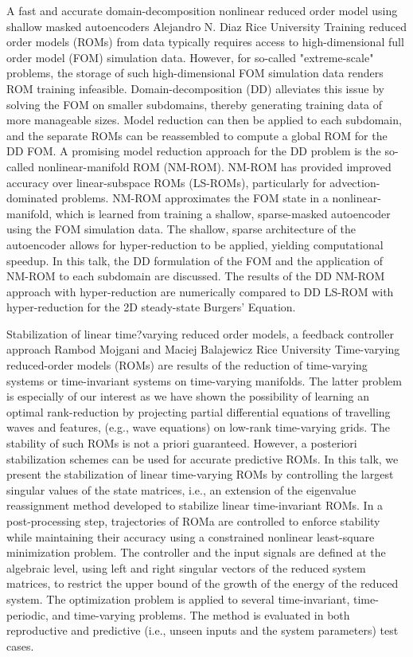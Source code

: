 \vspace{1.5ex}
\abs
{A fast and accurate domain-decomposition nonlinear reduced order model using shallow masked autoencoders}
{Alejandro N. Diaz}
{Rice University}
{Training reduced order models (ROMs) from data typically requires access to high-dimensional full order model (FOM) simulation data. However, for so-called "extreme-scale" problems, the storage of such high-dimensional FOM simulation data renders ROM training infeasible. Domain-decomposition (DD) alleviates this issue by solving the FOM on smaller subdomains, thereby generating training data of more manageable sizes. Model reduction can then be applied to each subdomain, and the separate ROMs can be reassembled to compute a global ROM for the DD FOM. A promising model reduction approach for the DD problem is the so-called nonlinear-manifold ROM (NM-ROM). NM-ROM has provided improved accuracy over linear-subspace ROMs (LS-ROMs), particularly for advection-dominated problems. NM-ROM approximates the FOM state in a nonlinear-manifold, which is learned from training a shallow, sparse-masked autoencoder using the FOM simulation data. The shallow, sparse architecture of the autoencoder allows for hyper-reduction to be applied, yielding computational speedup. In this talk, the DD formulation of the FOM and the application of NM-ROM to each subdomain are discussed. The results of the DD NM-ROM approach with hyper-reduction are numerically compared to DD LS-ROM with hyper-reduction for the 2D steady-state Burgers' Equation.}


\vspace{1.5ex}
\abs
{Stabilization of linear time?varying reduced order models, a feedback controller approach}
{Rambod Mojgani and Maciej Balajewicz}
{Rice University}
{Time-varying reduced-order models (ROMs) are results of the reduction of time-varying systems or time-invariant systems on time-varying manifolds.
The latter problem is especially of our interest as we have shown the possibility of learning an optimal rank-reduction by projecting partial differential equations of travelling waves and features, (e.g., wave equations) on low-rank time-varying grids.
The stability of such ROMs is not a priori guaranteed. However, a posteriori stabilization schemes can be used for accurate predictive ROMs. In this talk, we present the stabilization of linear time-varying ROMs by controlling the largest singular values of the state matrices, i.e., an extension of the eigenvalue reassignment method developed to stabilize linear time-invariant ROMs.
In a post-processing step, trajectories of ROMa are controlled to enforce stability while maintaining their accuracy using a constrained nonlinear least-square minimization problem. The controller and the input signals are defined at the algebraic level, using left and right singular vectors of the reduced system matrices, to restrict the upper bound of the growth of the energy of the reduced system. The optimization problem is applied to several time-invariant, time-periodic, and time-varying problems. The method is evaluated in both reproductive and predictive (i.e., unseen inputs and the system parameters) test cases.}


